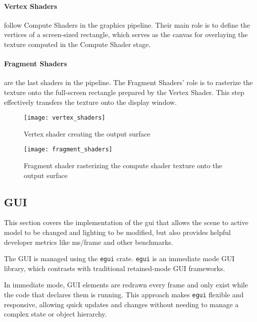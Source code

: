 \paragraph{Vertex Shaders} follow Compute Shaders in the graphics pipeline. Their main role is to define the vertices of a screen-sized rectangle, which serves as the canvas for overlaying the texture computed in the Compute Shader stage.
\paragraph{Fragment Shaders} are the last shaders in the pipeline. The Fragment Shaders' role is to rasterize the texture onto the full-screen rectangle prepared by the Vertex Shader. This step effectively transfers the texture onto the display window.
\begin{multicols}{2}
  \begin{figure}[H]
    \centering
    \texttt{[image: vertex\_shaders]}
    \caption[Vertex shader visualization]{Vertex shader creating the output surface}
  \end{figure}

  \begin{figure}[H]
    \centering
    \texttt{[image: fragment\_shaders]}
    \caption[Fragment shader visualization]{Fragment shader rasterizing the compute shader texture onto the output surface}
  \end{figure}
\end{multicols}

\subsection{GUI}

This section covers the implementation of the \acrshort{gui} that allows the scene to active model to be changed and lighting to be modified, but also provides helpful developer metrics like ms/frame and other benchmarks.

The GUI is managed using the \verb|egui| crate\supercite{egui:doc}.
\verb|egui| is an immediate\supercite{im_gui} mode GUI library, which contrasts with traditional retained-mode GUI frameworks\supercite{im_vs_rt}.

In immediate mode, GUI elements are redrawn every frame and only exist while the code that declares them is running. This approach makes \verb|egui| flexible and responsive, allowing quick updates and changes without needing to manage a complex state or object hierarchy.

